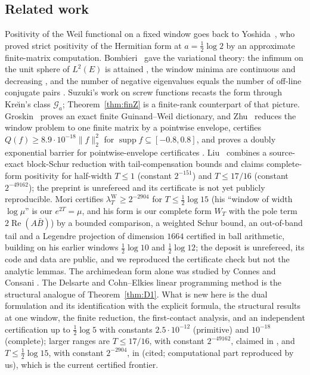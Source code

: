 \documentclass[11pt]{amsart}
\theoremstyle{definition}
\theoremstyle{remark}
\newcommand{\Rel}{\operatorname{Re}}
\newcommand{\supp}{\operatorname{supp}}
\newcommand{\lamW}{\lambda^{\mathrm W}_T}
\begin{document}
\subsection{Related work}\label{subsec:related}
Positivity of the Weil functional on a fixed window goes back to Yoshida~\cite{Yoshida1992}, who proved
strict positivity of the Hermitian form at $a=\tfrac12\log 2$ by an approximate finite-matrix computation.
Bombieri~\cite{Bombieri2000} gave the variational theory: the infimum on the unit sphere of $L^2(E)$ is
attained \cite[Thm.~3]{Bombieri2000}, the window minima are continuous and decreasing
\cite[Thm.~5]{Bombieri2000}, and the number of negative eigenvalues equals the number of off-line conjugate
pairs \cite[Thm.~8]{Bombieri2000}. Suzuki's work on screw functions
\cite{Suzuki2023jlms,Suzuki2023screwline,Suzuki2025hilbert} recasts the form through Kre\u{\i}n's class
$\mathcal G_a$; Theorem~\ref{thm:finZ} is a finite-rank counterpart of that picture. Groskin~\cite{Groskin2026}
proves an exact finite Guinand--Weil dictionary, and Zhu~\cite{Zhu2026} reduces the window problem to one
finite matrix by a pointwise envelope, certifies $Q(f)\ge 8.9\cdot 10^{-18}\|f\|_2^2$ for
$\supp f\subseteq[-0.8,0.8]$, and proves a doubly exponential barrier for pointwise-envelope certificates
\cite[Thm.~1.4]{Zhu2026}. Liu~\cite{Liu2026} combines a source-exact block-Schur reduction with
tail-compensation bounds and claims complete-form positivity for half-width $T\le1$ (constant $2^{-151}$)
and $T\le17/16$ (constant $2^{-49162}$); the preprint is unrefereed and its certificate is not yet
publicly reproducible. Mori \cite{Mori15} certifies $\lamW\ge2^{-2904}$ for $T\le\frac12\log15$
(his ``window of width $\log\mu$'' is our $e^{2T}=\mu$, and his form is our complete form $W_T$ with the
pole term $2\Rel(A\bar B)$) by a bounded comparison, a weighted Schur bound, an out-of-band tail and a
Legendre projection of dimension $1664$ certified in ball arithmetic, building on his earlier windows
$\frac12\log10$ and $\frac12\log12$; the deposit is unrefereed, its code and data are public, and we
reproduced the certificate check but not the analytic lemmas. The archimedean form alone was studied by Connes and Consani
\cite{ConnesConsani2021}. The Delsarte and Cohn--Elkies linear programming method \cite{CohnElkies2003} is
the structural analogue of Theorem~\ref{thm:D1}. What is new here is the dual formulation and its
identification with the explicit formula, the structural results at one window, the finite reduction, the
first-contact analysis, and an independent certification up to $\frac12\log5$ with constants
$2.5\cdot10^{-12}$ (primitive) and $10^{-18}$ (complete); larger ranges are $T\le17/16$, with constant
$2^{-49162}$, claimed in \cite{Liu2026}, and $T\le\frac12\log15$, with constant $2^{-2904}$, in
\cite{Mori15} (cited; computational part reproduced by us), which is the current certified frontier.
\end{document}
